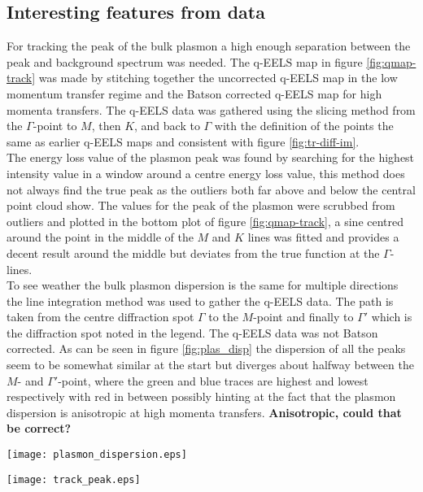 \subsection{Interesting features from data}
%
For tracking the peak of the bulk plasmon a high enough separation between the peak and background spectrum was needed. The q-EELS map in figure \ref{fig:qmap-track} was made by stitching together the uncorrected q-EELS map in the low momentum transfer regime and the Batson corrected q-EELS map for high momenta transfers. The q-EELS data was gathered using the slicing method from the $\Gamma$-point to $M$, then $K$, and back to $\Gamma$ with the definition of the points the same as earlier q-EELS maps and consistent with figure \ref{fig:tr-diff-im}.\\
The energy loss value of the plasmon peak was found by searching for the highest intensity value in a window around a centre energy loss value, this method does not always find the true peak as the outliers both far above and below the central point cloud show. The values for the peak of the plasmon were scrubbed from outliers and plotted in the bottom plot of figure \ref{fig:qmap-track}, a sine centred around the point in the middle of the $M$ and $K$ lines was fitted and provides a decent result around the middle but deviates from the true function at the $\Gamma$-lines.\\
To see weather the bulk plasmon dispersion is the same for multiple directions the line integration method was used to gather the q-EELS data. The path is taken from the centre diffraction spot $\Gamma$ to the $M$-point and finally to $\Gamma '$ which is the diffraction spot noted in the legend. The q-EELS data was not Batson corrected. As can be seen in figure \ref{fig:plas_disp} the dispersion of all the peaks seem to be somewhat similar at the start but diverges about halfway between the $M$- and $\Gamma '$-point, where the green and blue traces are highest and lowest respectively with red in between possibly hinting at the fact that the plasmon dispersion is anisotropic at high momenta transfers. \textbf{Anisotropic, could that be correct?}

\begin{minipage}{0.48\linewidth}
	\centering
	\captionsetup{width=0.8\linewidth}
	\texttt{[image: plasmon\_dispersion.eps]}
	\label{fig:plas_disp}
\end{minipage}%
\begin{minipage}{0.48\linewidth}
	\centering
	\captionsetup{width=0.8\linewidth}
	\texttt{[image: track\_peak.eps]}
	\label{fig:track_peak}
\end{minipage}

